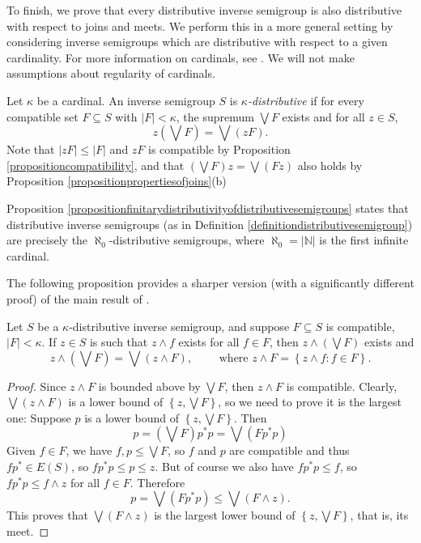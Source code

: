 To finish, we prove that every distributive inverse semigroup is also distributive with respect to joins and meets. We perform this in a more general setting  by considering inverse semigroups  which are distributive with respect to a given cardinality. For more information on cardinals, see \cite[Chapter 3]{MR1940513}. We will not make assumptions about regularity of cardinals.

\begin{definition}[{\cite[p.\ 82]{MR1940513}}]\label{definitionkappadistributivesemigroup}
Let $\kappa$ be a cardinal. An inverse semigroup $S$ is \emph{$\kappa$-distributive} if for every compatible set $F\subseteq S$ with $|F|<\kappa$, the supremum $\bigvee F$ exists and for all $z\in S$,
\[z\left(\bigvee F\right)=\bigvee(zF).\]
Note that $|zF|\leq |F|$ and $zF$ is compatible by Proposition \ref{propositioncompatibility}, and that $\left(\bigvee F\right)z=\bigvee(Fz)$ also holds by Proposition \ref{propositionpropertiesofjoins}(b)
\end{definition}

Proposition \ref{propositionfinitarydistributivityofdistributivesemigroups} states that distributive inverse semigroups (as in Definition \ref{definitiondistributivesemigroup}) are precisely the $\aleph_0$-distributive semigroups, where $\aleph_0=|\mathbb{N}|$ is the first infinite cardinal.

The following proposition provides a sharper version (with a significantly different proof) of the main result of \cite{MR2277324}.

\begin{proposition}\label{propositionkappadistributivedistributemeets}
Let $S$ be a $\kappa$-distributive inverse semigroup, and suppose $F\subseteq S$ is compatible, $|F|<\kappa$. If $z\in S$ is such that $z\land f$ exists for all $f\in F$, then $z\land\left(\bigvee F\right)$ exists and
\[z\land(\bigvee F)=\bigvee(z\land F),\qquad\text{ where }z\land F=\left\{z\land f:f\in F\right\}.\]
\end{proposition}
\begin{proof}
Since $z\land F$ is bounded above by $\bigvee F$, then $z\land F$ is compatible. Clearly, $\bigvee(z\land F)$ is a lower bound of $\left\{z,\bigvee F\right\}$, so we need to prove it is the largest one: Suppose $p$ is a lower bound of $\left\{z,\bigvee F\right\}$. Then
\[p=\left(\bigvee F\right)p^*p=\bigvee (Fp^*p)\]
Given $f\in F$, we have $f,p\leq\bigvee F$, so $f$ and $p$ are compatible and thus $fp^*\in E(S)$, so $fp^*p\leq p\leq z$. But of course we also have $fp^*p\leq f$, so $fp^*p\leq f\land z$ for all $f\in F$. Therefore
\[p=\bigvee (Fp^*p)\leq\bigvee(F\land z).\]
This proves that $\bigvee(F\land z)$ is the largest lower bound of $\left\{z,\bigvee F\right\}$, that is, its meet.\qedhere
\end{proof}


